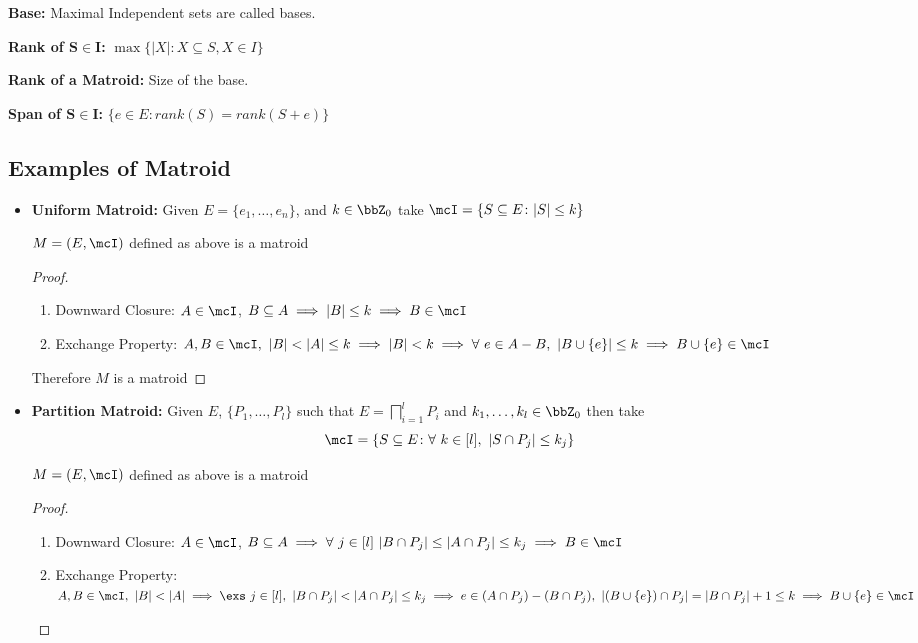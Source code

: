 \textbf{Base:} Maximal Independent sets are called bases.

\textbf{Rank of $\boldsymbol{S\in I}$:} $\max\{|X|\colon X\subseteq S, X\in I\}$

\textbf{Rank of a Matroid:} Size of the base.

\textbf{Span of $\boldsymbol{S\in I}$:} $\{e\in E\colon rank(S)=rank(S+e)\}$



\subsection{Examples of Matroid}
\begin{itemize}[label=$\bullet$]
\item \textbf{Uniform Matroid:} Given $E=\{e_1,\dots, e_n\}$, and $k\in\bbZ_0$ take $\mcI=\{S\subseteq E\colon |S|\leq k\}$
\begin{lemma}{}{}
	$M=(E,\mcI)$ defined as above is a matroid
\end{lemma}
\begin{proof}
	\begin{enumerate}[label=\bfseries\tiny\protect\circled{\small\arabic*}]
		\item Downward Closure: $A\in \mcI$, $B\subseteq A\implies |B|\leq k\implies B\in \mcI$
		\item Exchange Property: $A,B\in\mcI,\ |B|<|A|\leq k\implies |B|<k\implies \forall\ e\in A-B,\ |B\cup \{e\}|\leq k\implies B\cup \{e\}\in \mcI$
	\end{enumerate}
Therefore $M$ is a matroid
\end{proof}
\item \textbf{Partition Matroid:} Given $E$, $\{P_1,\dots, P_l\}$ such that $E=\bigsqcap\limits_{i=1}^lP_i$ and $k_1,\dots, k_l\in\bbZ_0$ then take $$\mcI=\{S\subseteq E\colon \forall\ k\in[l],\ |S\cap P_j|\leq k_j\}$$
\begin{lemma}{}{}
	$M=(E,\mcI)$ defined as above is a matroid
\end{lemma}
\begin{proof}
		\begin{enumerate}[label=\bfseries\tiny\protect\circled{\small\arabic*}]
		\item Downward Closure: $A\in \mcI$, $B\subseteq A\implies \forall\ j\in[l]\ |B\cap P_j|\leq |A\cap P_j|\leq k_j\implies B\in \mcI$
		\item Exchange Property: $A,B\in\mcI,\ |B|<|A|\implies \exs \ j\in[l],\ |B\cap P_j|< |A\cap P_j|\leq k_j\implies e\in (A\cap P_j)-{(B\cap P_j)}, \ |(B\cup\{e\})\cap P_j|=|B\cap P_j|+1\leq k\implies B\cup \{e\}\in\mcI$

\end{enumerate}
\end{proof}
\end{itemize}
